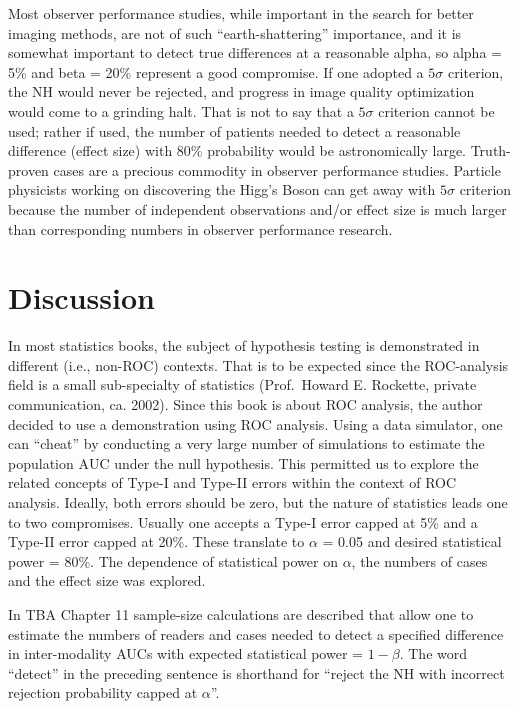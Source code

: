 \documentclass[
]{book}
\begin{document}
Most observer performance studies, while important in the search for better imaging methods, are not of such ``earth-shattering'' importance, and it is somewhat important to detect true differences at a reasonable alpha, so alpha = 5\% and beta = 20\% represent a good compromise. If one adopted a \(5\sigma\) criterion, the NH would never be rejected, and progress in image quality optimization would come to a grinding halt. That is not to say that a \(5\sigma\) criterion cannot be used; rather if used, the number of patients needed to detect a reasonable difference (effect size) with 80\% probability would be astronomically large. Truth-proven cases are a precious commodity in observer performance studies. Particle physicists working on discovering the Higg's Boson can get away with \(5\sigma\) criterion because the number of independent observations and/or effect size is much larger than corresponding numbers in observer performance research.

\hypertarget{HypothesisTestingDiscussion}{%
\section{Discussion}\label{HypothesisTestingDiscussion}}

In most statistics books, the subject of hypothesis testing is demonstrated in different (i.e., non-ROC) contexts. That is to be expected since the ROC-analysis field is a small sub-specialty of statistics (Prof.~Howard E. Rockette, private communication, ca. 2002). Since this book is about ROC analysis, the author decided to use a demonstration using ROC analysis. Using a data simulator, one can ``cheat'' by conducting a very large number of simulations to estimate the population \(\text{AUC}\) under the null hypothesis. This permitted us to explore the related concepts of Type-I and Type-II errors within the context of ROC analysis. Ideally, both errors should be zero, but the nature of statistics leads one to two compromises. Usually one accepts a Type-I error capped at 5\% and a Type-II error capped at 20\%. These translate to \(\alpha\) = 0.05 and desired statistical power = 80\%. The dependence of statistical power on \(\alpha\), the numbers of cases and the effect size was explored.

In TBA Chapter 11 sample-size calculations are described that allow one to estimate the numbers of readers and cases needed to detect a specified difference in inter-modality AUCs with expected statistical power = \(1-\beta\). The word ``detect'' in the preceding sentence is shorthand for ``reject the NH with incorrect rejection probability capped at \(\alpha\)''.
\end{document}
